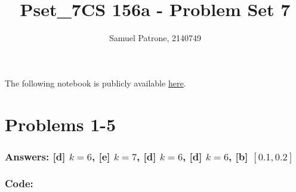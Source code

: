 \documentclass[11pt]{article}
\title{Pset\_7}
\begin{document}
    \title{CS 156a - Problem Set 7}
    \author{Samuel Patrone, 2140749}
    \maketitle
    

The following notebook is publicly available
\href{https://github.com/spatrone/CS156A-Caltech.git}{here}.

\tableofcontents

    \hypertarget{problems-1-5}{%
\section{Problems 1-5}\label{problems-1-5}}

\hypertarget{answers-d-k6-e-k7-d-k6-d-k6-b-0.10.2}{%
\subsubsection{\texorpdfstring{Answers: {[}d{]} \(k=6\), {[}e{]}
\(k=7\), {[}d{]} \(k=6\), {[}d{]} \(k=6\), {[}b{]}
\([0.1,0.2]\)}{Answers: {[}d{]} k=6, {[}e{]} k=7, {[}d{]} k=6, {[}d{]} k=6, {[}b{]} {[}0.1,0.2{]}}}\label{answers-d-k6-e-k7-d-k6-d-k6-b-0.10.2}}

\hypertarget{code}{%
\subsubsection{Code:}\label{code}}
\end{document}
